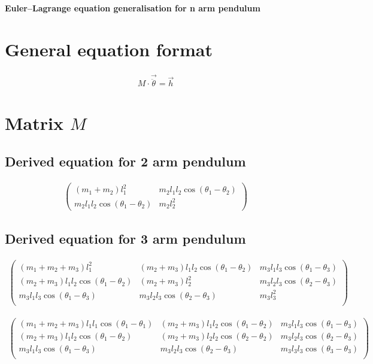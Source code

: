 \documentclass[11pt,a4paper]{article}
\begin{document}
\begin{center}
{\fontsize{16}{19.2}\selectfont\bfseries Euler--Lagrange equation generalisation for n arm pendulum}
\end{center}

\section{General equation format}

\begin{align}
    M \cdot \vec{\ddot{\theta}} = \vec{h}
\end{align}

\section{Matrix $M$}
\subsection{Derived equation for 2 arm pendulum}
\begin{align}
    \begin{pmatrix}
        (m_1 + m_2) l_1^2 & m_2 l_1 l_2 \cos(\theta_1 - \theta_2) \\
        m_2 l_1 l_2 \cos(\theta_1 - \theta_2) & m_2 l_2^2
    \end{pmatrix}
\end{align}

\subsection{Derived equation for 3 arm pendulum}
\begin{align}
    \begin{pmatrix}
        (m_1 + m_2 + m_3) l_1^2 & (m_2 + m_3) l_1 l_2 \cos(\theta_1 - \theta_2) & m_3 l_1 l_3 \cos(\theta_1 - \theta_3) \\
        (m_2 + m_3) l_1 l_2 \cos(\theta_1 - \theta_2) & (m_2 + m_3) l_2^2 & m_3 l_2 l_3 \cos(\theta_2 - \theta_3) \\
        m_3 l_1 l_3 \cos(\theta_1 - \theta_3) & m_3 l_2 l_3 \cos(\theta_2 - \theta_3) & m_3 l_3^2  \\
    \end{pmatrix}
\end{align}

\begin{align}
    \begin{pmatrix}
        (m_1 + m_2 + m_3) l_1 l_1 \cos(\theta_1 - \theta_1) & (m_2 + m_3) l_1 l_2 \cos(\theta_1 - \theta_2) & m_3 l_1 l_3 \cos(\theta_1 - \theta_3) \\
        (m_2 + m_3) l_1 l_2 \cos(\theta_1 - \theta_2) & (m_2 + m_3) l_2 l_2 \cos(\theta_2 - \theta_2) & m_3 l_2 l_3 \cos(\theta_2 - \theta_3) \\
        m_3 l_1 l_3 \cos(\theta_1 - \theta_3) & m_3 l_2 l_3 \cos(\theta_2 - \theta_3) & m_3 l_3 l_3 \cos(\theta_3 - \theta_3)  \\
    \end{pmatrix}
\end{align}
\end{document}
